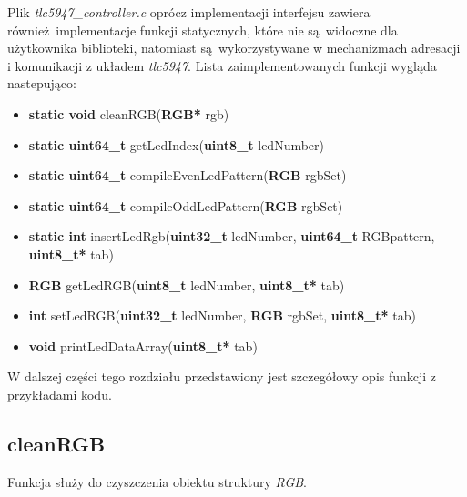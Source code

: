 \documentclass[eng,printmode]{mgr}
\begin{document}
\vspace{0.3cm}

\begin{minipage}{\textwidth}
Plik \emph{tlc5947\_controller.c} oprócz implementacji interfejsu zawiera również implementacje funkcji statycznych, które nie są widoczne dla użytkownika biblioteki, natomiast są wykorzystywane w mechanizmach adresacji i komunikacji z układem \emph{tlc5947}. Lista zaimplementowanych funkcji wygląda nastepująco:

  \begin{itemize}[before=\ttfamily]
    \item{\textbf{static void} cleanRGB(\textbf{RGB*} rgb)}
    \item{\textbf{static uint64\_t} getLedIndex(\textbf{uint8\_t} ledNumber)} 
    \item{\textbf{static uint64\_t} compileEvenLedPattern(\textbf{RGB} rgbSet)} 
    \item{\textbf{static uint64\_t} compileOddLedPattern(\textbf{RGB} rgbSet)} 
    \item{\textbf{static int} insertLedRgb(\textbf{uint32\_t} ledNumber, \textbf{uint64\_t} RGBpattern, \textbf{uint8\_t*} tab)} 
    \item{\textbf{RGB} getLedRGB(\textbf{uint8\_t} ledNumber, \textbf{uint8\_t*} tab)} 
    \item{\textbf{int} setLedRGB(\textbf{uint32\_t} ledNumber, \textbf{RGB} rgbSet, \textbf{uint8\_t*} tab)} 
    \item{\textbf{void} printLedDataArray(\textbf{uint8\_t*} tab)} 
  \end{itemize}
\end{minipage}

\vspace{0.7cm}

W dalszej części tego rozdziału przedstawiony jest szczegółowy opis funkcji z przykładami kodu.

\subsection{cleanRGB} 

Funkcja służy do czyszczenia obiektu struktury \emph{RGB}.
\end{document}
